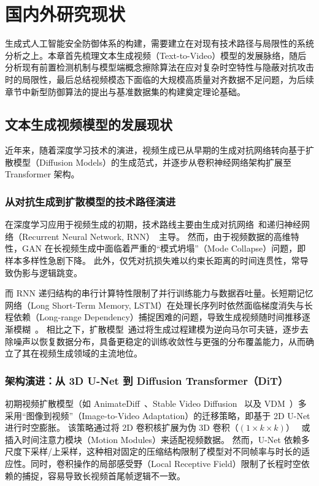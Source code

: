 \chapter{国内外研究现状}\label{chap:dataset}

生成式人工智能安全防御体系的构建，需要建立在对现有技术路径与局限性的系统分析之上。本章首先梳理文本生成视频（Text-to-Video）模型的发展脉络，随后分析现有前置检测机制与模型端概念擦除算法在应对复杂时空特性与隐蔽对抗攻击时的局限性，最后总结视频模态下面临的大规模高质量对齐数据不足问题，为后续章节中新型防御算法的提出与基准数据集的构建奠定理论基础。

\section{文本生成视频模型的发展现状}\label{sec:text_to_video}

近年来，随着深度学习技术的演进，视频生成已从早期的生成对抗网络转向基于扩散模型（Diffusion Models）的生成范式，并逐步从卷积神经网络架构扩展至 Transformer 架构。

\subsection{从对抗生成到扩散模型的技术路径演进} 

在深度学习应用于视频生成的初期，技术路线主要由生成对抗网络~\cite{goodfellow2014generative}和递归神经网络（Recurrent Neural Network, RNN）~\cite{rumelhart1986learning,goodfellow2016deep}主导。
然而，由于视频数据的高维特性，GAN 在长视频生成中面临着严重的“模式坍塌”（Mode Collapse）问题，即样本多样性急剧下降。
此外，仅凭对抗损失难以约束长距离的时间连贯性，常导致伪影与逻辑跳变。

而 RNN 递归结构的串行计算特性限制了并行训练能力与数据吞吐量。长短期记忆网络（Long Short-Term Memory, LSTM）在处理长序列时依然面临梯度消失与长程依赖（Long-range Dependency）捕捉困难的问题，导致生成视频随时间推移逐渐模糊~\cite{hochreiter1997long}。
相比之下，扩散模型~\cite{Song2020ScoreBasedGM, Ho2020DenoisingDP}通过将生成过程建模为逆向马尔可夫链，逐步去除噪声以恢复数据分布，具备更稳定的训练收敛性与更强的分布覆盖能力，从而确立了其在视频生成领域的主流地位。

\subsection{架构演进：从 3D U-Net 到 Diffusion Transformer（DiT）} 

初期视频扩散模型（如 AnimateDiff~\cite{guo2023animatediff}、Stable Video Diffusion~\cite{blattmann2023stable} 以及 VDM~\cite{ho2022video}）多采用“图像到视频”（Image-to-Video Adaptation）的迁移策略，即基于 2D U-Net 进行时空膨胀。
该策略通过将 2D 卷积核扩展为伪 3D 卷积（$(1 \times k \times k)$）~\cite{singer2022make} 或插入时间注意力模块（Motion Modules）来适配视频数据。
然而，U-Net 依赖多尺度下采样/上采样，这种相对固定的压缩结构限制了模型对不同帧率与时长的适应性。同时，卷积操作的局部感受野（Local Receptive Field）限制了长程时空依赖的捕捉，容易导致长视频首尾帧逻辑不一致。

